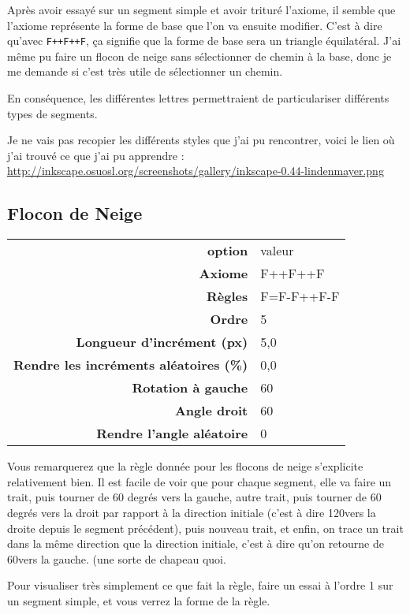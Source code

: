 \documentclass[a4paper,twoside]{article}
\begin{document}
\begin{remarque}
Après avoir essayé sur un segment simple et avoir trituré l'axiome, il semble que l'axiome représente la forme de base que l'on va ensuite modifier. C'est à dire qu'avec \texttt{F++F++F}, ça signifie que la forme de base sera un triangle équilatéral. J'ai même pu faire un flocon de neige sans sélectionner de chemin à la base, donc je me demande si c'est très utile de sélectionner un chemin.

En conséquence, les différentes lettres permettraient de particulariser différents types de segments.
\end{remarque}

Je ne vais pas recopier les différents styles que j'ai pu rencontrer, voici le lien où j'ai trouvé ce que j'ai pu apprendre :
\url{http://inkscape.osuosl.org/screenshots/gallery/inkscape-0.44-lindenmayer.png}

\subsection{Flocon de Neige}
\begin{tabular}{>{\bfseries}r<{}@{ : }p{6cm}}
option &	valeur\\
Axiome & F++F++F\\
Règles & F=F-F++F-F\\
Ordre & 5\\
Longueur d'incrément (px) & 5,0\\
Rendre les incréments aléatoires (\%) & 0,0\\
Rotation à gauche & 60\\
Angle droit & 60 \\
Rendre l'angle aléatoire & 0
\end{tabular}

\begin{remarque}
Vous remarquerez que la règle donnée pour les flocons de neige s'explicite relativement bien. Il est facile de voir que pour chaque segment, elle va faire un trait, puis tourner de 60 degrés vers la gauche, autre trait, puis tourner de 60 degrés vers la droit par rapport à la direction initiale (c'est à dire 120\degre vers la droite depuis le segment précédent), puis nouveau trait, et enfin, on trace un trait dans la même direction que la direction initiale, c'est à dire qu'on retourne de 60\degre vers la gauche. (une sorte de chapeau quoi.

Pour visualiser très simplement ce que fait la règle, faire un essai à l'ordre 1 sur un segment simple, et vous verrez la forme de la règle.
\end{remarque}



\printindex
\end{document}
